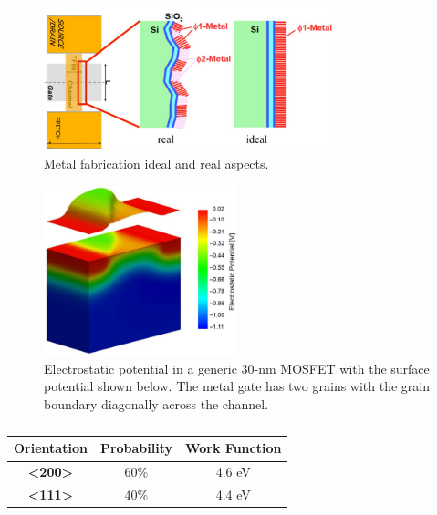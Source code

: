 \documentclass[pgmicro,diss,english]{iiufrgs}
\begin{document}
\begin{figure} []
        \centering
	\includegraphics[width=0.75\textwidth, trim={0 0 0 0},clip]{chrome_2019-05-15_16-55-31.pdf}
        \caption{Metal fabrication ideal and real aspects.}
        \label{fig:meinMetalFab}
\end{figure}

\begin{figure} []
        \centering
        \includegraphics[width=0.5\textwidth, trim={0 0 0 0},clip]{pic-selected-190513-1743-08.pdf}
        \caption{Electrostatic potential in a generic 30-nm MOSFET with the surface potential shown below. The metal gate has two grains with the grain boundary diagonally across the channel.}
        \label{WFFelectros}
\end{figure}

\begin{table}[]
\centering
\caption{}
\label{tab:WFForient}
\begin{tabular}{ccc}
\hline
\textbf{Orientation}                  & \textbf{Probability} & \textbf{Work Function} \\ \hline
\textbf{\textless{}200\textgreater{}} & 60\%                 & 4.6 eV                 \\ \hline
\textbf{\textless{}111\textgreater{}} & 40\%                 & 4.4 eV                 \\ \hline
\end{tabular}
\end{table}
\end{document}
